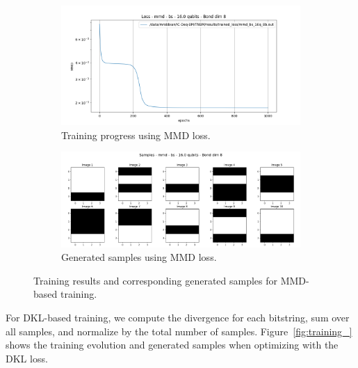 \begin{figure}[h]
    \centering
    \begin{subfigure}[b]{\textwidth}  
        \centering
        \includegraphics[width=\textwidth]{images/loss_plot/loss_mmd_bs_16.0q_8b_2000i.png}
        \caption{Training progress using MMD loss.}
    \end{subfigure}
    \hfill
    \begin{subfigure}[b]{\textwidth}  
        \centering
        \includegraphics[width=\textwidth]{images/sample_plot/samples_mmd_bs_16.0q_8b_2000i.png}
        \caption{Generated samples using MMD loss.}
    \end{subfigure}
    \caption{Training results and corresponding generated samples for MMD-based training.}
    \label{fig:training_mmd}
\end{figure}

For DKL-based training, we compute the divergence for each bitstring, sum over all samples, and normalize by the total number of samples. Figure~\ref{fig:training_} shows the training evolution and generated samples when optimizing with the DKL loss.

